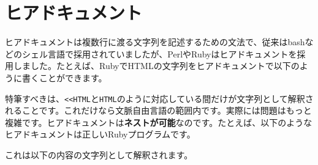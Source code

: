\hypertarget{chapter7-ux30d2ux30a2ux30c9ux30adux30e5ux30e1ux30f3ux30c8}{%
\section{ヒアドキュメント}\label{chapter7-ux30d2ux30a2ux30c9ux30adux30e5ux30e1ux30f3ux30c8}}

ヒアドキュメントは複数行に渡る文字列を記述するための文法で、従来はbashなどのシェル言語で採用されていましたが、PerlやRubyはヒアドキュメントを採用しました。たとえば、RubyでHTMLの文字列をヒアドキュメントで以下のように書くことができます。

\begin{Shaded}
\begin{Highlighting}[]
\end{Highlighting}
\end{Shaded}

特筆すべきは、\texttt{\textless{}\textless{}HTML}と\texttt{HTML}のように対応している間だけが文字列として解釈されることです。これだけなら文脈自由言語の範囲内です。実際には問題はもっと複雑です。ヒアドキュメントは\textbf{ネストが可能}なのです。たとえば、以下のようなヒアドキュメントは正しいRubyプログラムです。

\begin{Shaded}
\begin{Highlighting}[]
\end{Highlighting}
\end{Shaded}

これは以下の内容の文字列として解釈されます。

\begin{Shaded}
\begin{Highlighting}[]
\end{Highlighting}
\end{Shaded}


